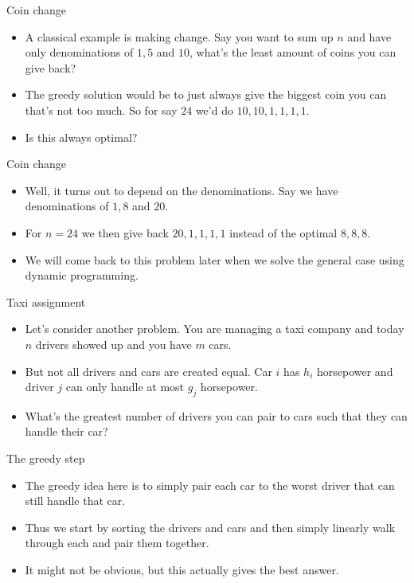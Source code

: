 \documentclass{beamer}
\begin{document}
\begin{frame}[plain]{Coin change}
    \begin{itemize}
        \item A classical example is making change. Say you want to sum up $n$ and have only denominations of $1, 5$ and $10$, what's the least amount of coins you can give back?
        \item The greedy solution would be to just always give the biggest coin you can that's not too much. So for say $24$ we'd do $10, 10, 1, 1, 1, 1$.
        \item Is this always optimal?
    \end{itemize}
\end{frame}

\begin{frame}[plain]{Coin change}
    \begin{itemize}
        \item Well, it turns out to depend on the denominations. Say we have denominations of $1, 8$ and $20$.
        \item For $n = 24$ we then give back $20, 1, 1, 1, 1$ instead of the optimal $8, 8, 8$.
        \item We will come back to this problem later when we solve the general case using dynamic programming.
    \end{itemize}
\end{frame}

\begin{frame}[plain]{Taxi assignment}
    \begin{itemize}
        \item Let's consider another problem. You are managing a taxi company and today $n$ drivers showed up and you have $m$ cars. 
        \item But not all drivers and cars are created equal. Car $i$ has $h_i$ horsepower and driver $j$ can only handle at most $g_j$ horsepower.
        \item What's the greatest number of drivers you can pair to cars such that they can handle their car?
    \end{itemize}
\end{frame}

\begin{frame}[plain]{The greedy step}
    \begin{itemize}
        \item The greedy idea here is to simply pair each car to the worst driver that can still handle that car.
        \item Thus we start by sorting the drivers and cars and then simply linearly walk through each and pair them together.
        \item It might not be obvious, but this actually gives the best answer.
    \end{itemize}
\end{frame}
\end{document}
